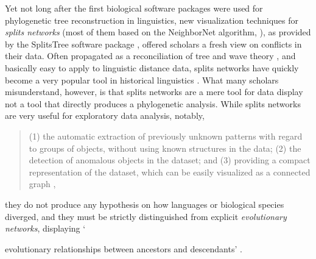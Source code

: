 \documentclass[svgnames,12pt]{scrartcl}
\begin{document}
{Yet not long after the first biological software packages were used for phylogenetic tree
reconstruction in linguistics, new
visualization techniques for \emph{splits networks} (most of them based on the NeighborNet algorithm,
\citealt{Bryant2004}), as provided by the SplitsTree software package \citep{Huson1998}, offered
scholars a fresh view on conflicts in their data. Often propagated as a reconciliation of
tree and wave theory \citep{Hamed2006,McMahon2005}, and basically easy to apply to
linguistic distance data, splits networks have quickly become a very popular tool in historical
linguistics \citep{Heggarty2010,Hamed2005,Bowern2010}. What many scholars misunderstand, however, is
that splits networks are a mere tool for data display \citep{Morrison2010} not a tool that directly
produces a phylogenetic analysis. While splits
networks are very useful for exploratory data analysis, notably, 
\begin{quote}
(1) the automatic extraction of previously unknown patterns with regard to groups of
objects, without using known structures in the data;
(2) the detection of anomalous objects in the dataset;
and (3) providing a compact representation of the
dataset, which can be easily visualized as a connected
graph \citep[2]{Morrison2014b},
\end{quote}
they do not produce any hypothesis on how languages or biological species diverged, and they must be
strictly distinguished from explicit \emph{evolutionary networks}, displaying `{evolutionary
relationships between ancestors and descendants' \citep[43]{Morrison2011}.
 
}}
\end{document}
